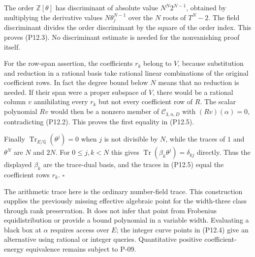 The order $\mathbb Z[\theta]$ has discriminant of absolute value
$N^N2^{N-1}$, obtained by multiplying the derivative values
$N\theta_j^{N-1}$ over the $N$ roots of $T^N-2$.  The field discriminant divides the order discriminant by the square of the order index.  This proves (P12.3).  No discriminant estimate is needed for the nonvanishing proof itself.

For the row-span assertion, the coefficients $r_k$ belong to $V$, because substitution and reduction in a rational basis take rational linear combinations of the original coefficient rows.  In fact the degree bound below $N$ means that no reduction is needed.  If their span were a proper subspace of $V$, there would be a rational column $v$ annihilating every $r_k$ but not every coefficient row of $R$.  The scalar polynomial $Rv$ would then be a nonzero member of $\mathcal C_{3,n,D}$ with $(Rv)(\alpha)=0$, contradicting (P12.2).  This proves the first equality in (P12.5).

Finally $\operatorname{Tr}_{E/\mathbb Q}(\theta^j)=0$ when $j$ is not divisible by $N$, while the traces of $1$ and $\theta^N$ are $N$ and $2N$.  For $0\le j,k<N$ this gives
$\operatorname{Tr}(\beta_k\theta^j)=\delta_{kj}$ directly.  Thus the displayed $\beta_k$ are the trace-dual basis, and the traces in (P12.5) equal the coefficient rows $r_k$.  $\square$

The arithmetic trace here is the ordinary number-field trace.  This construction supplies the previously missing effective algebraic point for the width-three class through rank preservation.  It does not infer that point from Frobenius equidistribution or provide a bound polynomial in a variable width.  Evaluating a black box at $\alpha$ requires access over $E$; the integer curve points in (P12.4) give an alternative using rational or integer queries.  Quantitative positive coefficient-energy equivalence remains subject to P-09.
